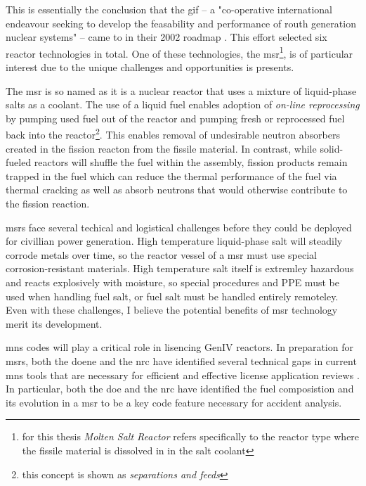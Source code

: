This is essentially the conclusion that the \Gls{gif} -- a "co-operative international endeavour seeking to develop the feasability and performance of routh generation nuclear systems" \cite{gif_homepage} -- came to in their 2002 roadmap \cite{doe-ne_technology_2002}. This effort selected six reactor technologies in total. One of these technologies, the \Gls{msr}\footnote{for this thesis {\it Molten Salt Reactor} refers specifically to the reactor type where the fissile material is dissolved in in the salt
coolant}, is of particular interest due to the unique challenges and opportunities is presents.

The \Gls{msr} is so named as it is a nuclear reactor that uses a mixture of liquid-phase salts as a coolant. The use of a liquid fuel enables adoption of {\it on-line reprocessing} by pumping used fuel out of the reactor and pumping fresh or reprocessed fuel back into the reactor\footnote{this concept is shown as {\it separations and feeds}}. This enables removal of undesirable neutron absorbers created in the fission reacton from the fissile material. In contrast, while solid-fueled reactors will shuffle
    the fuel within the assembly, fission products remain trapped in the fuel which can reduce the thermal performance of the fuel via thermal cracking as well as absorb neutrons that would otherwise contribute to the fission reaction. 

    \Gls{msr}s face several techical and logistical challenges before they could be deployed for civillian power generation. High temperature liquid-phase salt will steadily corrode metals over time, so  the reactor vessel of a \Gls{msr} must use special corrosion-resistant materials. High temperature salt itself is extremley hazardous and reacts explosively with moisture, so special procedures and PPE must be used when handling fuel salt, or fuel salt must be handled entirely
    remoteley. Even with these challenges, I believe the potential benefits of \Gls{msr} technology merit its development.

\Gls{mns} codes will play a critical role in lisencing GenIV reactors. In preparation for \Gls{msr}s, both the \Gls{doene} and the \Gls{nrc} have identified several technical gaps in current \Gls{mns} tools that are necessary for efficient and effective license application reviews \cite{betzler_modeling_2019} \cite{usnrc_nonlwr_2020-1}. In particular, both the \Gls{doe} and the \Gls{nrc} have identified the fuel composistion and its evolution in a \Gls{msr} to be a key code feature
necessary for accident analysis. 

